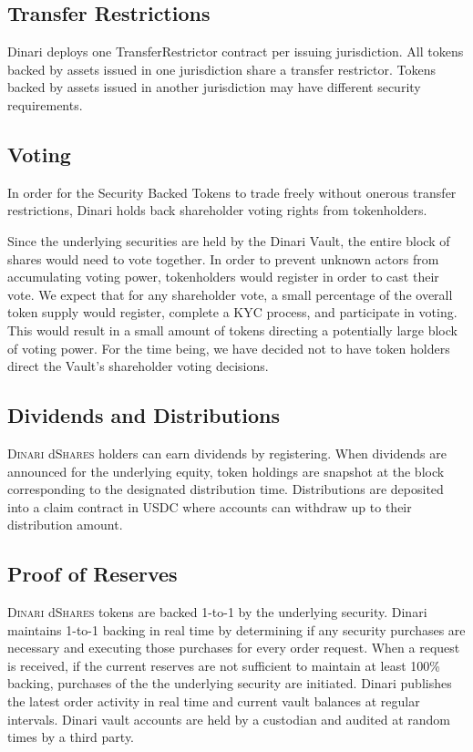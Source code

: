 \documentclass[sigconf,nonacm,prologue,table]{acmart}
\numberwithin{equation}{section}
\theoremstyle{definition}
\theoremstyle{remark}
\newcommand{\dshares}{\textsc{Dinari} d\textsc{Shares} }
\begin{document}
\subsection{Transfer Restrictions}

Dinari deploys one TransferRestrictor contract per issuing jurisdiction. All tokens backed by assets issued in one jurisdiction share a transfer restrictor. Tokens backed by assets issued in another jurisdiction may have different security requirements.

\subsection{Voting}

In order for the Security Backed Tokens to trade freely without onerous transfer restrictions, Dinari holds back shareholder voting rights from tokenholders.

Since the underlying securities are held by the Dinari Vault, the entire block of shares would need to vote together. In order to prevent unknown actors from accumulating voting power, tokenholders would register in order to cast their vote. We expect that for any shareholder vote, a small percentage of the overall token supply would register, complete a KYC process, and participate in voting. This would result in a small amount of tokens directing a potentially large block of voting power. For the time being, we have decided not to have token holders direct the Vault’s shareholder voting decisions.

\subsection{Dividends and Distributions}

\dshares holders can earn dividends by registering. When dividends are announced for the underlying equity, token holdings are snapshot at the block corresponding to the designated distribution time. Distributions are deposited into a claim contract in USDC where accounts can withdraw up to their distribution amount.

\subsection{Proof of Reserves}

\dshares tokens are backed 1-to-1 by the underlying security. Dinari maintains 1-to-1 backing in real time by determining if any security purchases are necessary and executing those purchases for every order request. When a request is received, if the current reserves are not sufficient to maintain at least 100\% backing, purchases of the the underlying security are initiated. Dinari publishes the latest order activity in real time and current vault balances at regular intervals. Dinari vault accounts are held by a custodian and audited at random times by a third party. 
\end{document}
